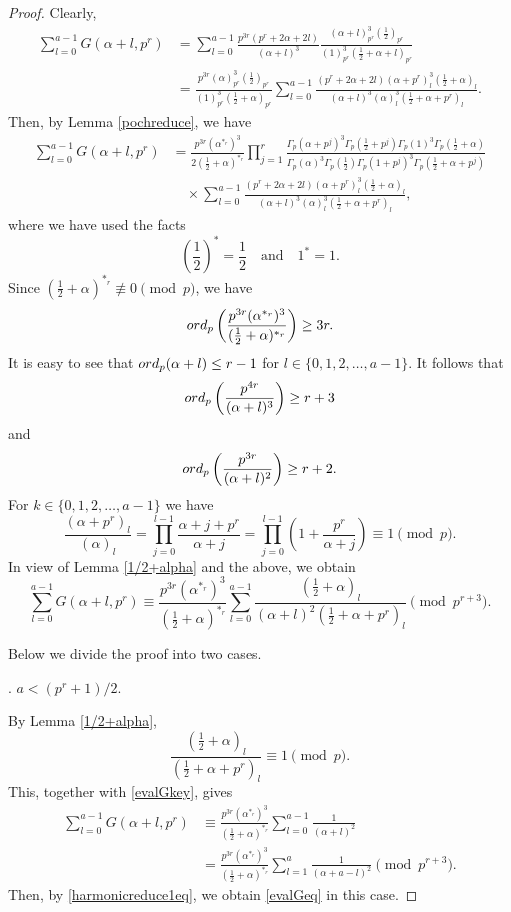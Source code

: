 \documentclass[10pt,a4paper]{amsart}
\def\eq{\equiv}
\def\f{\frac}
\def\l{\left}
\def\ord{{\rm ord}}
\def\r{\right}
\def\t{\text}
\begin{document}
\begin{proof}
Clearly,
\begin{align*}
\sum_{l=0}^{a-1}G(\alpha+l,p^r)&=\sum_{l=0}^{a-1}\f{p^{3r}(p^r+2\alpha+2l)}{(\alpha+l)^3}\f{(\alpha+l)_{p^r}^3(\f12)_{p^r}}{(1)_{p^r}^3(\f12+\alpha+l)_{p^r}}\\
&=\f{p^{3r}(\alpha)_{p^r}^3(\f12)_{p^r}}{(1)_{p^r}^3(\f12+\alpha)_{p^r}}\sum_{l=0}^{a-1}\f{(p^r+2\alpha+2l)(\alpha+p^r)_l^3(\f12+\alpha)_l}{(\alpha+l)^3(\alpha)_l^3(\f12+\alpha+p^r)_l}.
\end{align*}
Then, by Lemma \ref{pochreduce}, we have
\begin{align*}
\sum_{l=0}^{a-1}G(\alpha+l,p^r)&=\f{p^{3r}(\alpha^{\ast_r})^3}{2(\f12+\alpha)^{\ast_r}}\prod_{j=1}^r\f{\Gamma_p(\alpha+p^j)^3\Gamma_p(\f12+p^j)\Gamma_p(1)^3\Gamma_p(\f12+\alpha)}{\Gamma_p(\alpha)^3\Gamma_p(\f12)\Gamma_p(1+p^j)^3\Gamma_p(\f12+\alpha+p^j)}\\
&\quad\times \sum_{l=0}^{a-1}\f{(p^r+2\alpha+2l)(\alpha+p^r)_l^3(\f12+\alpha)_l}{(\alpha+l)^3(\alpha)_l^3(\f12+\alpha+p^r)_l},
\end{align*}
where we have used the facts
$$
\l(\f12\r)^{\ast}=\f12\quad \t{and}\quad 1^{\ast}=1.
$$
Since $(\f12+\alpha)^{\ast_r}\not\eq0\pmod{p}$, we have
$$
\ord_p\l(\f{p^{3r}(\alpha^{\ast_r})^3}{(\f12+\alpha)^{\ast_r}}\r)\geq 3r.
$$
It is easy to see that $\ord_p(\alpha+l)\leq r-1$ for $l\in\{0,1,2,\ldots,a-1\}$. It follows that
$$
\ord_p\l(\f{p^{4r}}{(\alpha+l)^3}\r)\geq r+3
$$
and
$$
\ord_p\l(\f{p^{3r}}{(\alpha+l)^2}\r)\geq r+2.
$$
For $k\in\{0,1,2,\ldots,a-1\}$ we have
$$
\f{(\alpha+p^r)_l}{(\alpha)_l}=\prod_{j=0}^{l-1}\f{\alpha+j+p^r}{\alpha+j}=\prod_{j=0}^{l-1}\l(1+\f{p^r}{\alpha+j}\r)\eq1\pmod{p}.
$$
In view of Lemma \ref{1/2+alpha} and the above, we obtain
\begin{equation}\label{evalGkey}
\sum_{l=0}^{a-1}G(\alpha+l,p^r)\eq\f{p^{3r}(\alpha^{\ast_r})^3}{(\f12+\alpha)^{\ast_r}}\sum_{l=0}^{a-1}\f{(\f12+\alpha)_l}{(\alpha+l)^2(\f12+\alpha+p^r)_l}\pmod{p^{r+3}}.
\end{equation}


Below we divide the proof into two cases.

\medskip

. $a<(p^r+1)/2$.

\medskip

By Lemma \ref{1/2+alpha},
$$
\f{(\f12+\alpha)_l}{(\f12+\alpha+p^r)_l}\eq1\pmod{p}.
$$
This, together with \eqref{evalGkey}, gives
\begin{align*}
\sum_{l=0}^{a-1}G(\alpha+l,p^r)&\eq \f{p^{3r}(\alpha^{\ast_r})^3}{(\f12+\alpha)^{\ast_r}}\sum_{l=0}^{a-1}\f{1}{(\alpha+l)^2}\\
&=\f{p^{3r}(\alpha^{\ast_r})^3}{(\f12+\alpha)^{\ast_r}}\sum_{l=1}^{a}\f{1}{(\alpha+a-l)^2}\pmod{p^{r+3}}.
\end{align*}
Then, by \eqref{harmonicreduce1eq}, we obtain \eqref{evalGeq} in this case.


\end{proof}
\end{document}
